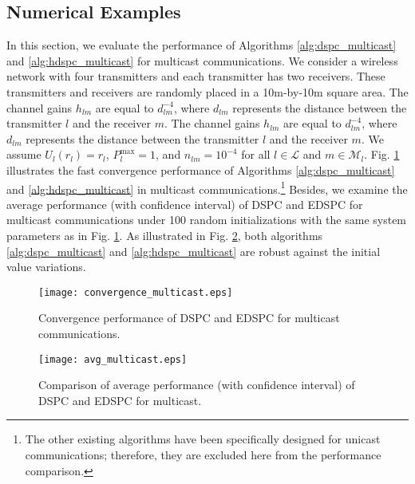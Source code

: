 \documentclass[10pt,journal,letterpaper,compsoc]{IEEEtran}
\begin{document}
{{\subsection{Numerical Examples}
In this section, we evaluate the performance of Algorithms \ref{alg:dspc_multicast} and \ref{alg:hdspc_multicast} for multicast communications. We consider a wireless network with four transmitters and each transmitter has two receivers.
These transmitters and receivers are randomly placed in a 10m-by-10m square area. The channel gains $h_{lm}$ are equal to $d_{lm}^{-4}$, where $d_{lm}$ represents the distance between the transmitter $l$ and the receiver $m$.
The channel gains $h_{lm}$ are equal to $d_{lm}^{-4}$, where $d_{lm}$ represents the distance between the transmitter $l$ and the receiver $m$. We assume $U_l(r_l)=r_l$, $P_l^{\max}=1$, and $n_{lm}=10^{-4}$ for all $l\in\mathcal{L}$ and $m\in\mathcal{M}_l$.
Fig. \ref{fig:convergence_multicast} illustrates the fast convergence performance of Algorithms \ref{alg:dspc_multicast} and \ref{alg:hdspc_multicast} in multicast communications.\footnote{The other existing algorithms have been specifically designed for unicast communications; therefore, they are excluded here from the performance comparison.} Besides, we examine the average performance (with confidence interval) of DSPC and EDSPC for multicast communications under 100 random initializations with the same system parameters as in Fig. \ref{fig:convergence_multicast}. As illustrated in Fig. \ref{fig:comparison_multicast}, both algorithms \ref{alg:dspc_multicast} and \ref{alg:hdspc_multicast} are robust against the initial value variations.

\begin{figure}[t]
\begin{center}
\vspace{-0.0cm}\hspace{-0.0cm} {\texttt{[image: convergence\_multicast.eps]}}\hspace{-0.0cm}
\caption{Convergence performance of DSPC and EDSPC for multicast communications.}
\label{fig:convergence_multicast}
\end{center}
\end{figure}




\begin{figure}[t]
\begin{center}
\vspace{0cm}\hspace{0cm} {\texttt{[image: avg\_multicast.eps]}}\hspace{-0cm}
\vspace{-1.5cm} \caption{Comparison of average performance (with confidence interval) of DSPC and EDSPC for multicast.}\vspace{-0cm}
\label{fig:comparison_multicast}
\end{center}
\end{figure}



}}
\end{document}
